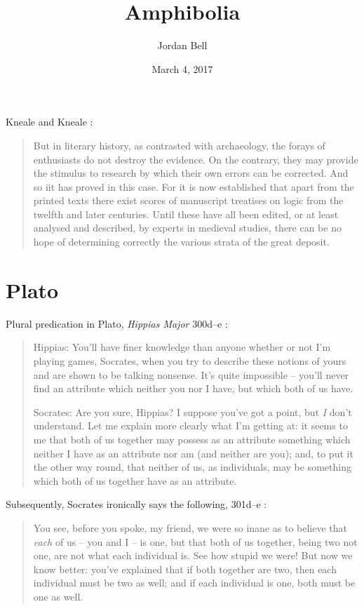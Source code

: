 \documentclass{article}
\begin{document}
\title{Amphibolia}
\author{Jordan Bell}
\date{March 4, 2017}

\maketitle



Kneale and Kneale \cite[p.~224]{kneale}:

\begin{quote}
But in literary history,
as contrasted with archaeology, the forays of enthusiasts do not
destroy the evidence. On the contrary, they may provide the stimulus
to research by which their own errors can be corrected. And so
iit has proved in this case. For it is now established that apart
from the printed texts there exist scores of manuscript treatises
on logic from the twelfth and later centuries. Until these have all
been edited, or at least analysed and described, by experts in
medieval studies, there can be no hope of determining correctly
the various strata of the great deposit.
\end{quote}


\section{Plato}
Plural predication in Plato, {\em Hippias Major} 300d--e \cite[p.~259]{hippias}:

\begin{quote}
Hippias: You'll have  finer knowledge than anyone whether or not I'm
playing games, Socrates, when you try to describe these notions of yours
and are shown to be talking nonsense. It's quite impossible -- you'll never
find an attribute which neither you nor I have, but which both of us have.

Socrates: Are you sure, Hippias? I suppose you've got a point, but
{\em I} don't understand. Let me explain more clearly what I'm getting at: it
seems to me that both of us together may possess as an attribute something
which neither I have as an attribute nor am (and neither are you); and, to
put it the other way round, that neither of us, as individuals, may be
something which both of us together have as an attribute.
\end{quote}

Subsequently, Socrates ironically says the following, 301d--e \cite[p.~260]{hippias}:

\begin{quote}
You see, before you spoke, my friend,
we were so inane as to believe that {\em each} of us -- you and I -- is one, but that
both of us together, being two not one, are not what each individual is.
See how stupid we were! But now we know better: you've explained that
if both together are two, then each individual must be two as well; and if
each individual is one, both must be one as well.
\end{quote}
\end{document}
